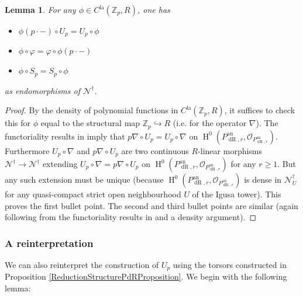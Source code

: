 \documentclass[10pt, oneside]{amsart}
\numberwithin{equation}{subsection}
\newtheorem{lemma}[equation]{Lemma}
\theoremstyle{definition}
\theoremstyle{remark}
\newcommand{\mbb}[1]{\mathbb{#1}}
\newcommand{\opn}[1]{\operatorname{#1}}
\begin{document}
\begin{lemma} \label{ClaHeckeIntertwiningLemma}
For any $\phi \in C^{\opn{la}}(\mbb{Z}_p, R)$, one has 
\begin{itemize}
    \item $\phi(p \cdot -) \circ U_p = U_p \circ \phi$
    \item $\phi \circ \varphi = \varphi \circ \phi(p \cdot -)$
    \item $\phi \circ S_p = S_p \circ \phi$
\end{itemize}
as endomorphisms of $\mathscr{N}^{\dagger}$.
\end{lemma}
\begin{proof}
By the density of polynomial functions in $C^{\opn{la}}(\mbb{Z}_p, R)$, it suffices to check this for $\phi$ equal to the structural map $\mbb{Z}_p \hookrightarrow R$ (i.e. for the operator $\nabla$). The functoriality results in \cite[\S 6.2]{AI_LLL} imply that $p \nabla \circ U_p = U_p \circ \nabla$  on $\opn{H}^0\left( P_{\opn{dR}, r}^{\opn{an}}, \mathcal{O}_{P_{\opn{dR}, r}^{\opn{an}}} \right)$. Furthermore $U_p \circ \nabla$ and $p\nabla \circ U_p$ are two continuous $R$-linear morphisms $\mathscr{N}^{\dagger} \to \mathscr{N}^{\dagger}$ extending $U_p \circ \nabla = p\nabla \circ U_p$ on $\opn{H}^0\left( P_{\opn{dR}, r}^{\opn{an}}, \mathcal{O}_{P_{\opn{dR}, r}^{\opn{an}}} \right)$ for any $r \geq 1$. But any such extension must be unique (because $\opn{H}^0\left( P_{\opn{dR}, r}^{\opn{an}}, \mathcal{O}_{P_{\opn{dR}, r}^{\opn{an}}} \right)$ is dense in $\mathscr{N}^{\dagger}_{U}$ for any quasi-compact strict open neighbourhood $U$ of the Igusa tower). This proves the first bullet point. The second and third bullet points are similar (again following from the functoriality results in \cite[\S 6.2]{AI_LLL} and a density argument).
\end{proof}

\subsubsection{A reinterpretation}

We can also reinterpret the construction of $U_p$ using the torsors constructed in Proposition \ref{ReductionStructurePdRProposition}. We begin with the following lemma:
\end{document}
